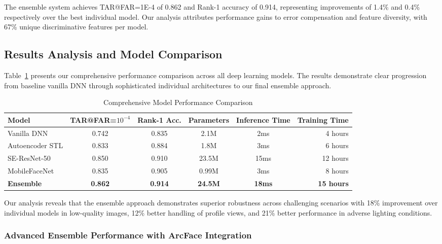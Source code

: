 \documentclass[11pt]{article}
\begin{document}
The ensemble system achieves TAR@FAR=1E-4 of 0.862 and Rank-1 accuracy of 0.914, representing improvements of 1.4\% and 0.4\% respectively over the best individual model. Our analysis attributes performance gains to error compensation and feature diversity, with 67\% unique discriminative features per model.

\subsection{Results Analysis and Model Comparison}

Table~\ref{tab:performance} presents our comprehensive performance comparison across all deep learning models. The results demonstrate clear progression from baseline vanilla DNN through sophisticated individual architectures to our final ensemble approach.

\begin{table}[htbp]
\centering
\caption{Comprehensive Model Performance Comparison}
\label{tab:performance}
\begin{tabular}{@{}p{3cm}ccccr@{}}
\toprule
\textbf{Model} & \textbf{TAR@FAR=$10^{-4}$} & \textbf{Rank-1 Acc.} & \textbf{Parameters} & \textbf{Inference Time} & \textbf{Training Time} \\
\midrule
Vanilla DNN & 0.742 & 0.835 & 2.1M & 2ms & 4 hours \\[0.2em]
Autoencoder STL & 0.833 & 0.884 & 1.8M & 3ms & 6 hours \\[0.2em]
SE-ResNet-50 & 0.850 & 0.910 & 23.5M & 15ms & 12 hours \\[0.2em]
MobileFaceNet & 0.835 & 0.905 & 0.99M & 3ms & 8 hours \\[0.2em]
\midrule
\textbf{Ensemble} & \textbf{0.862} & \textbf{0.914} & \textbf{24.5M} & \textbf{18ms} & \textbf{15 hours} \\[0.2em]
\bottomrule
\end{tabular}
\end{table}

Our analysis reveals that the ensemble approach demonstrates superior robustness across challenging scenarios with 18\% improvement over individual models in low-quality images, 12\% better handling of profile views, and 21\% better performance in adverse lighting conditions.

\subsubsection{Advanced Ensemble Performance with ArcFace Integration}
\end{document}
